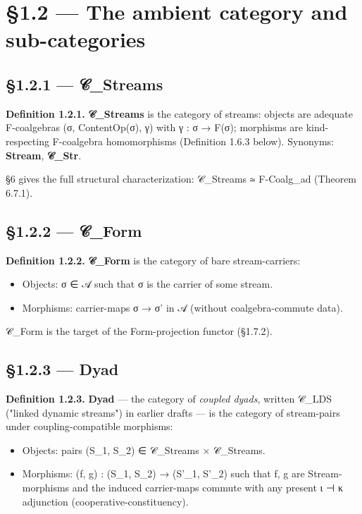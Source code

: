 \documentclass[11pt, openany]{book}
\newcommand{\sectionbreak}{\clearpage}
\begin{document}
\sectionbreak

\section{§1.2 --- The ambient category and sub-categories}

\subsection{§1.2.1 --- 𝒞\_\allowbreak{}Streams}

\textbf{Definition 1.2.1.} \textbf{𝒞\_\allowbreak{}Streams} is the category of streams: objects are adequate F-coalgebras (σ, ContentOp(σ), γ) with γ : σ → F(σ); morphisms are kind-respecting F-coalgebra homomorphisms (Definition 1.6.3 below). Synonyms: \textbf{Stream}, \textbf{𝒞\_\allowbreak{}Str}.

§6 gives the full structural characterization: 𝒞\_\allowbreak{}Streams ≃ F-Coalg\_\allowbreak{}ad (Theorem 6.7.1).

\subsection{§1.2.2 --- 𝒞\_\allowbreak{}Form}

\textbf{Definition 1.2.2.} \textbf{𝒞\_\allowbreak{}Form} is the category of bare stream-carriers:
\begin{itemize}
\item Objects: σ ∈ 𝒜 such that σ is the carrier of some stream.
\item Morphisms: carrier-maps σ → σ' in 𝒜 (without coalgebra-commute data).
\end{itemize}

𝒞\_\allowbreak{}Form is the target of the Form-projection functor (§1.7.2).

\subsection{§1.2.3 --- Dyad}

\textbf{Definition 1.2.3.} \textbf{Dyad} --- the category of \textit{coupled dyads}, written 𝒞\_\allowbreak{}LDS ("linked dynamic streams") in earlier drafts --- is the category of stream-pairs under coupling-compatible morphisms:
\begin{itemize}
\item Objects: pairs (S\_\allowbreak{}1, S\_\allowbreak{}2) ∈ 𝒞\_\allowbreak{}Streams × 𝒞\_\allowbreak{}Streams.
\item Morphisms: (f, g) : (S\_\allowbreak{}1, S\_\allowbreak{}2) → (S'\_\allowbreak{}1, S'\_\allowbreak{}2) such that f, g are Stream-morphisms and the induced carrier-maps commute with any present ι ⊣ κ adjunction (cooperative-constituency).
\end{itemize}
\end{document}

